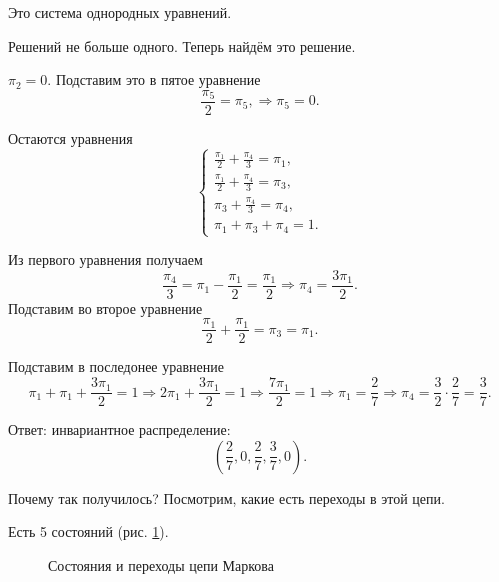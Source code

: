 Это система однородных уравнений.

Решений не больше одного.
Теперь найдём это решение.

$ \pi_2 = 0$.
Подставим это в пятое уравнение
\begin{equation*}
  \frac{ \pi_5}{2} = \pi_5, \Rightarrow
  \pi_5 = 0.
\end{equation*}

Остаются уравнения
\begin{equation*}
  \begin{cases}
    \frac{ \pi_1}{2} + \frac{ \pi_4}{3} = \pi_1, \\
    \frac{ \pi_1}{2} + \frac{ \pi_4}{3} = \pi_3, \\
    \pi_3 + \frac{\pi_4}{3} = \pi_4, \\
    \pi_1 + \pi_3 + \pi_4 = 1.
  \end{cases}
\end{equation*}

Из первого уравнения получаем
\begin{equation*}
  \frac{ \pi_4}{3} = \pi_1 - \frac{ \pi_1}{2} = \frac{ \pi_1}{2} \Rightarrow
  \pi_4 = \frac{3 \pi_1}{2}.
\end{equation*}
Подставим во второе уравнение
\begin{equation*}
  \frac{ \pi_1}{2} + \frac{ \pi_1}{2} =
  \pi_3 = \pi_1.
\end{equation*}

Подставим в последонее уравнение
\begin{equation*}
  \pi_1 + \pi_1 + \frac{3 \pi_1}{2} = 1 \Rightarrow
  2 \pi_1 + \frac{3 \pi_1}{2} = 1 \Rightarrow
  \frac{7 \pi_1}{2} = 1 \Rightarrow
  \pi_1 = \frac{2}{7} \Rightarrow
  \pi_4 = \frac{3}{2} \cdot \frac{2}{7} = \frac{3}{7}.
\end{equation*}

Ответ: инвариантное распределение:
\begin{equation*}
  \left( \frac{2}{7}, 0, \frac{2}{7}, \frac{3}{7}, 0 \right).
\end{equation*}

Почему так получилось?
Посмотрим, какие есть переходы в этой цепи.

Есть 5 состояний (рис. \ref{fig:1512}).

\begin{figure}[h]
  \centering
  
  \caption{Состояния и переходы цепи Маркова}
  \label{fig:1512}
\end{figure}

